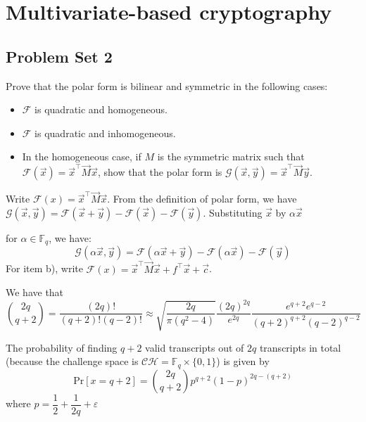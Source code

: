 \section{Multivariate-based cryptography} \label{sec: multivariate}


\subsection{Problem Set 2}

\begin{exercise}

    Prove that the polar form is bilinear and symmetric in the following cases:
    \begin{itemize}
    
      \item $\mathcal{F}$ is quadratic and homogeneous.

      \item $\mathcal{F}$ is quadratic and inhomogeneous.

      \item In the homogeneous case, if $M$ is the symmetric matrix such that 
        $\mathcal{F}(\vec{x}) = \vec{x}^{\top} \vec{M} \vec{x}$,
        show that the polar form is $\mathcal{G}(\vec{x}, \vec{y}) = \vec{x}^{\top} \vec{M} \vec{y}$.

    \end{itemize}

\end{exercise}

\begin{solution}

  Write $\mathcal{F}(x) = \vec{x}^{\top}\vec{M}\vec{x}$.
  From the definition of polar form, we have $\mathcal{G}(\vec{x}, \vec{y}) = \mathcal{F}(\vec{x} + \vec{y}) - \mathcal{F}(\vec{x}) - \mathcal{F}(\vec{y})$.
  Substituting $\vec{x}$ by $\alpha \vec{x}$ 

  for $\alpha \in \mathbb{F}_{q}$, we have:\[
    \mathcal{G}(\alpha\vec{x}, \vec{y}) = \mathcal{F}(\alpha\vec{x} + \vec{y}) - \mathcal{F}(\alpha\vec{x})- \mathcal{F}(\vec{y})
  \]
  For item b), write $\mathcal{F}(x) = \vec{x}^{\top}\vec{M}\vec{x} + f^{\top}\vec{x} + \vec{c}$.
\end{solution}


\begin{solution}

  We have that \[
    \binom{2q}{q+2} = \dfrac{(2q)!}{(q+2)!(q-2)!} \approx \sqrt{\dfrac{2q}{\pi\left(q^{2} - 4\right)}} \dfrac{\left(2q\right)^{2q}}{e^{2q}}\dfrac{e^{q+2}e^{q-2}}{\left(q+2\right)^{q+2}\left(q-2\right)^{q-2}}
  \]

  The probability of finding $q + 2$ valid transcripts out of $2q$ transcripts in total (because the challenge space is $\mathcal{CH} = \mathbb{F}_{q}\times\{0,1\}$) 
  is given by \[
    \mathrm{Pr}[x = q+2] = \binom{2q}{q+2}p^{q+2}\left(1-p\right)^{2q - (q+2)}
  \]
  where $p = \dfrac{1}{2} + \dfrac{1}{2q} + \varepsilon$

\end{solution}
